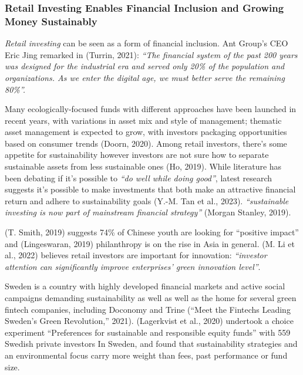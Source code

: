 \documentclass[
  12pt,
  letterpaper,
  DIV=11,
  numbers=noendperiod]{scrartcl}
\begin{document}
\subsubsection{Retail Investing Enables Financial Inclusion and Growing
Money
Sustainably}\label{retail-investing-enables-financial-inclusion-and-growing-money-sustainably}

\emph{Retail investing} can be seen as a form of financial inclusion.
Ant Group's CEO Eric Jing remarked in (Turrin, 2021): \emph{``The
financial system of the past 200 years was designed for the industrial
era and served only 20\% of the population and organizations. As we
enter the digital age, we must better serve the remaining 80\%''.}

Many ecologically-focused funds with different approaches have been
launched in recent years, with variations in asset mix and style of
management; thematic asset management is expected to grow, with
investors packaging opportunities based on consumer trends (Doorn,
2020). Among retail investors, there's some appetite for sustainability
however investors are not sure how to separate sustainable assets from
less sustainable ones (Ho, 2019). While literature has been debating if
it's possible to \emph{``do well while doing good''}, latest research
suggests it's possible to make investments that both make an attractive
financial return and adhere to sustainability goals (Y.-M. Tan et al.,
2023). \emph{``sustainable investing is now part of mainstream financial
strategy''} (Morgan Stanley, 2019).

(T. Smith, 2019) suggests 74\% of Chinese youth are looking for
``positive impact'' and (Lingeswaran, 2019) philanthropy is on the rise
in Asia in general. (M. Li et al., 2022) believes retail investors are
important for innovation: \emph{``investor attention can significantly
improve enterprises' green innovation level''}.

Sweden is a country with highly developed financial markets and active
social campaigns demanding sustainability as well as well as the home
for several green fintech companies, including Doconomy and Trine
({``Meet the Fintechs Leading {Sweden}'s Green Revolution,''} 2021).
(Lagerkvist et al., 2020) undertook a choice experiment ``Preferences
for sustainable and responsible equity funds'' with 559 Swedish private
investors In Sweden, and found that sustainability strategies and an
environmental focus carry more weight than fees, past performance or
fund size.
\end{document}
